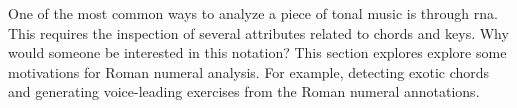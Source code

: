 
One of the most common ways to analyze a piece of tonal
music is through \gls{rna}. This requires the inspection of
several attributes related to chords and keys. Why would
someone be interested in this notation? This section
explores explore some motivations for Roman numeral
analysis. For example, detecting exotic chords and
generating voice-leading exercises from the Roman numeral
annotations.
